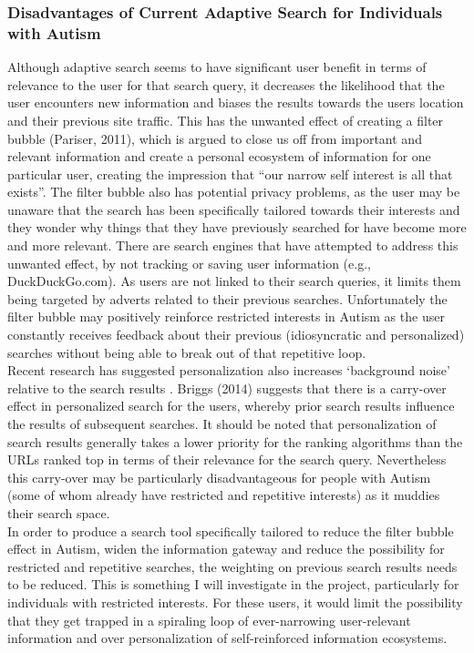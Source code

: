 \documentclass[a4paper, 11pt]{article}
\begin{document}
\subsubsection{Disadvantages of Current Adaptive Search for Individuals with Autism}
Although adaptive search seems to have significant user benefit in terms of relevance to the user for that search query, it decreases the likelihood that the user encounters new information and biases the results towards the users location and their previous site traffic.  This has the unwanted effect of creating a filter bubble (Pariser, 2011), which is argued to close us off from important and relevant information and create a personal ecosystem of information for one particular user, creating the impression that “our narrow self interest is all that exists”. The filter bubble also has potential privacy problems, as the user may be unaware that the search has been specifically tailored towards their interests and they wonder why things that they have previously searched for have become more and more relevant. There are search engines that have attempted to address this unwanted effect, by not tracking or saving user information (e.g., DuckDuckGo.com). As users are not linked to their search queries, it limits them being targeted by adverts related to their previous searches. Unfortunately the filter bubble may positively reinforce restricted interests in Autism as the user constantly receives feedback about their previous (idiosyncratic and personalized) searches without being able to break out of that repetitive loop. \\Recent research has suggested personalization also increases ‘background noise’ relative to the search results \cite{briggs}. Briggs (2014) suggests that there is a carry-over effect in personalized search for the users, whereby prior search results influence the results of subsequent searches. It should be noted that personalization of search results generally takes a lower priority for the ranking algorithms than the URLs ranked top in terms of their relevance for the search query. Nevertheless this carry-over may be particularly disadvantageous for people with Autism (some of whom already have restricted and repetitive interests) as it muddies their search space.\\
In order to produce a search tool specifically tailored to reduce the filter bubble effect in Autism, widen the information gateway and reduce the possibility for restricted and repetitive searches, the weighting on previous search results needs to be reduced. This is something I will investigate in the project, particularly for individuals with restricted interests. For these users, it would limit the possibility that they get trapped in a spiraling loop of ever-narrowing user-relevant information and over personalization of self-reinforced information ecosystems.
\end{document}
